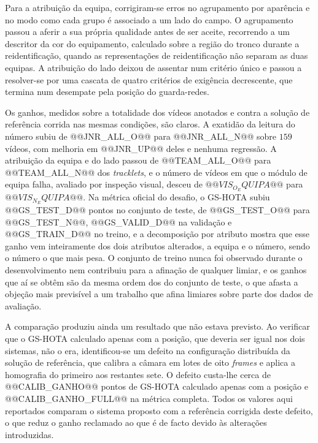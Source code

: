 Para a atribuição da equipa, corrigiram-se erros no agrupamento por aparência e no modo como cada
grupo é associado a um lado do campo. O agrupamento passou a aferir a sua própria qualidade antes de
ser aceite, recorrendo a um descritor da cor do equipamento, calculado sobre a região do tronco
durante a reidentificação, quando as representações de reidentificação não separam as duas equipas.
A atribuição do lado deixou de assentar num critério único e passou a resolver-se por uma cascata
de quatro critérios de exigência decrescente, que termina num desempate pela posição do
guarda-redes.

Os ganhos, medidos sobre a totalidade dos vídeos anotados e contra a solução de referência corrida
nas mesmas condições, são claros. A exatidão da leitura do número subiu de @@JNR_ALL_O@@ para
@@JNR_ALL_N@@ sobre $159$ vídeos, com melhoria em @@JNR_UP@@ deles e nenhuma regressão. A atribuição da equipa e do lado passou de @@TEAM_ALL_O@@ para @@TEAM_ALL_N@@ dos
\emph{tracklets}, e o número de vídeos em que o módulo de equipa falha, avaliado por inspeção
visual, desceu de $@@VIS_O_EQUIPA@@$ para $@@VIS_N_EQUIPA@@$. Na métrica oficial do desafio, o
GS-HOTA subiu @@GS_TEST_D@@ pontos no conjunto de teste, de @@GS_TEST_O@@ para @@GS_TEST_N@@,
@@GS_VALID_D@@ na validação e @@GS_TRAIN_D@@ no treino, e a decomposição por atributo mostra que
esse ganho vem inteiramente dos dois atributos alterados, a equipa e o número, sendo o número o que
mais pesa. O conjunto de treino nunca foi observado durante o desenvolvimento nem contribuiu para a
afinação de qualquer limiar, e os ganhos que aí se obtêm são da mesma ordem dos do conjunto de
teste, o que afasta a objeção mais previsível a um trabalho que afina limiares sobre parte dos dados
de avaliação.

A comparação produziu ainda um resultado que não estava previsto. Ao verificar que o GS-HOTA
calculado apenas com a posição, que deveria ser igual nos dois sistemas, não o era, identificou-se
um defeito na configuração distribuída da solução de referência, que calibra a câmara em lotes de
oito \emph{frames} e aplica a homografia do primeiro aos restantes sete. O defeito custa-lhe cerca
de @@CALIB_GANHO@@ pontos de GS-HOTA calculado apenas com a posição e @@CALIB_GANHO_FULL@@ na métrica
completa. Todos os valores aqui reportados comparam o sistema proposto
com a referência corrigida deste defeito, o que reduz o ganho reclamado ao que é de facto devido às
alterações introduzidas.

